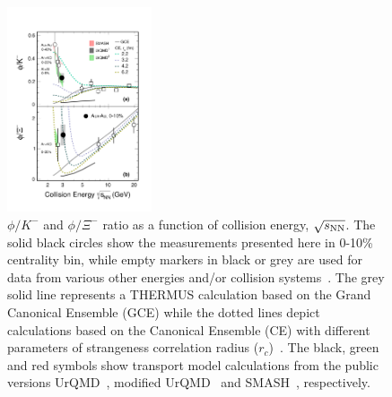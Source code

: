 \documentclass[%
 reprint,	
showpacs,
 amsmath,amssymb,
 aps,
 prc,
]{revtex4-1}
\begin{document}
\begin{figure}
\centering
\hspace*{-4mm}
\includegraphics[width=0.38\textwidth]{fig/fig4_phi_over_kminus_zoomin.eps}
  \caption{ $\phi/K^-$ and $\phi/\Xi^-$ ratio as a function of collision energy, $\sqrt{s_{\rm NN}}$. The solid black circles show the measurements presented here in 0-10\% centrality bin, while empty markers in black or grey are used for data from various other energies and/or collision systems~\cite{E917_phi,NA49_phi,FOPI_phi_AlAl,FOPI_phi_NiNi,HADES_phi_ArKCl,HADES_phi_AuAu,Xi_ArKCl_HADES,star_bes_strangeness}. The grey solid line represents a THERMUS calculation based on the Grand Canonical Ensemble (GCE) while the dotted lines depict calculations based on the Canonical Ensemble (CE) with different parameters of strangeness correlation radius ($r_c$)~\cite{THERMUS_WHEATON200984,Andronic_2018Naure}. The black, green and red symbols show transport model calculations from the public versions UrQMD~\cite{urQMD,UrQMD_2}, modified UrQMD~\cite{Steinheimer_2015_UrQMD} and SMASH~\cite{Elfner_SMASH}, respectively.}
\label{fig:phi2Kratio} 
\end{figure}
\end{document}
